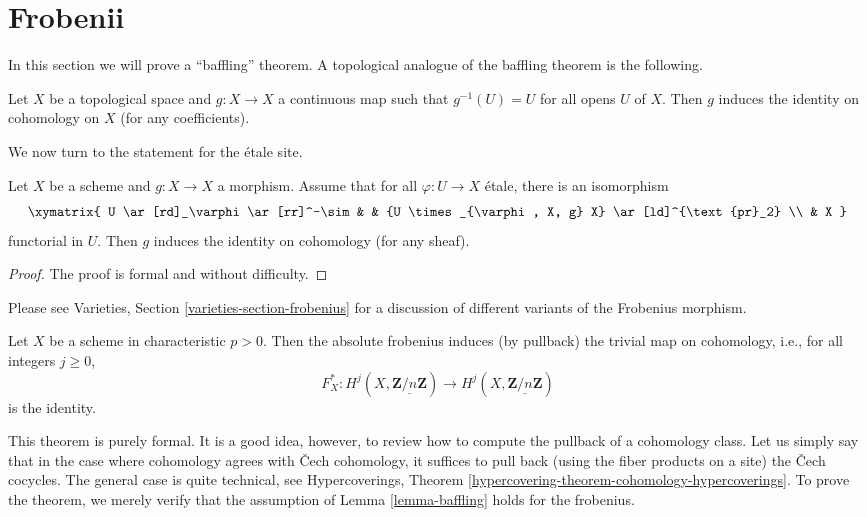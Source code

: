 \section{Frobenii}
\label{section-frobenii}

\noindent
In this section we will prove a ``baffling'' theorem.
A topological analogue of the baffling theorem is the following.

\begin{exercise}
\label{exercise-baffling}
Let $X$ be a topological space and $g : X \to X$ a continuous map such that
$g^{-1}(U) = U$ for all opens $U$ of $X$. Then $g$ induces the identity on
cohomology on $X$ (for any coefficients).
\end{exercise}

\noindent
We now turn to the statement for the \'etale site.

\begin{lemma}
\label{lemma-baffling}
Let $X$ be a scheme and $g : X \to X$ a morphism. Assume that for all
$\varphi : U \to X$ \'etale, there is an isomorphism
$$
\xymatrix{
U \ar[rd]_\varphi \ar[rr]^-\sim & & {U
\times_{\varphi, X, g} X} \ar[ld]^{\text{pr}_2} \\
& X
}
$$
functorial in $U$. Then $g$ induces the identity on cohomology (for any sheaf).
\end{lemma}

\begin{proof}
The proof is formal and without difficulty.
\end{proof}

\noindent
Please see Varieties, Section \ref{varieties-section-frobenius}
for a discussion of different variants of the Frobenius morphism.

\begin{theorem}
\label{theorem-baffling}
Let $X$ be a scheme in characteristic $p>0$. Then the absolute frobenius
induces (by pullback) the trivial map on cohomology, i.e., for all
integers $j\geq 0$,
$$
F_X^* : H^j (X, \underline{\mathbf{Z}/n\mathbf{Z}}) \longrightarrow H^j (X,
\underline{\mathbf{Z}/n\mathbf{Z}})
$$
is the identity.
\end{theorem}

\noindent
This theorem is purely formal. It is a good idea, however, to review how to
compute the pullback of a cohomology class. Let us simply say that in the case
where cohomology agrees with {\v C}ech cohomology, it suffices to pull back
(using the fiber products on a site) the {\v C}ech cocycles. The general case is
quite technical, see
Hypercoverings, Theorem \ref{hypercovering-theorem-cohomology-hypercoverings}.
To prove the theorem, we merely
verify that the assumption of Lemma \ref{lemma-baffling}
holds for the frobenius.

